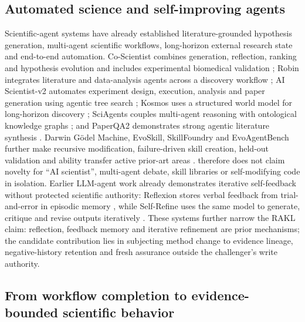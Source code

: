 \subsection{Automated science and self-improving agents}
Scientific-agent systems have already established literature-grounded hypothesis generation, multi-agent scientific workflows, long-horizon external research state and end-to-end automation. Co-Scientist combines generation, reflection, ranking and hypothesis evolution and includes experimental biomedical validation \cite{gottweis2026}; Robin integrates literature and data-analysis agents across a discovery workflow \cite{ghareeb2026}; AI Scientist-v2 automates experiment design, execution, analysis and paper generation using agentic tree search \cite{yamada2025}; Kosmos uses a structured world model for long-horizon discovery \cite{mitchener2025}; SciAgents couples multi-agent reasoning with ontological knowledge graphs \cite{ghafarollahi2024}; and PaperQA2 demonstrates strong agentic literature synthesis \cite{skarlinski2024}. Darwin G\"odel Machine, EvoSkill, SkillFoundry and EvoAgentBench further make recursive modification, failure-driven skill creation, held-out validation and ability transfer active prior-art areas \cite{zhang2025,alzubi2026,shen2026,gao2026}. \RAKL{} therefore does not claim novelty for ``AI scientist'', multi-agent debate, skill libraries or self-modifying code in isolation. Earlier LLM-agent work already demonstrates iterative self-feedback without protected scientific authority: Reflexion stores verbal feedback from trial-and-error in episodic memory \cite{shinn2023}, while Self-Refine uses the same model to generate, critique and revise outputs iteratively \cite{madaan2023}. These systems further narrow the RAKL claim: reflection, feedback memory and iterative refinement are prior mechanisms; the candidate contribution lies in subjecting method change to evidence lineage, negative-history retention and fresh assurance outside the challenger's write authority.

\subsection{From workflow completion to evidence-bounded scientific behavior}

